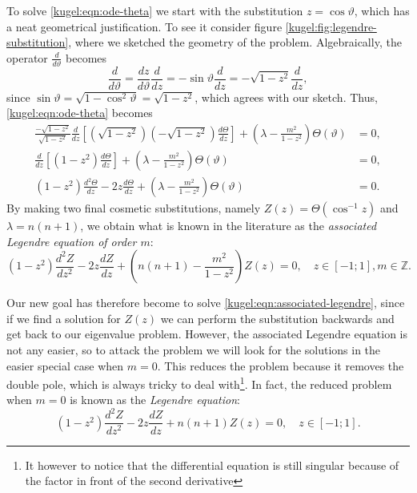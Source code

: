 To solve \eqref{kugel:eqn:ode-theta} we start with the substitution $z = \cos
\vartheta$, which has a neat geometrical justification. To see it consider
figure \ref{kugel:fig:legendre-substitution}, where we sketched the geometry of
the problem. Algebraically, the operator $\frac{d}{d \vartheta}$ becomes
\begin{equation*}
    \frac{d}{d \vartheta}
    = \frac{dz}{d \vartheta}\frac{d}{dz}
    = -\sin \vartheta \frac{d}{dz}
    = -\sqrt{1-z^2} \frac{d}{dz},
\end{equation*} 
since $\sin \vartheta = \sqrt{1 - \cos^2 \vartheta} = \sqrt{1 - z^2}$, which
agrees with our sketch. Thus, \eqref{kugel:eqn:ode-theta} becomes 
\begin{align*}
  \frac{-\sqrt{1-z^2}}{\sqrt{1-z^2}} \frac{d}{dz} \left[
    \left(\sqrt{1-z^2}\right) \left(-\sqrt{1-z^2}\right) \frac{d \Theta}{dz}
  \right]
  + \left( \lambda - \frac{m^2}{1 - z^2} \right)\Theta(\vartheta) &= 0,
  \\
  \frac{d}{dz} \left[ (1-z^2) \frac{d \Theta}{dz} \right]
  + \left( \lambda - \frac{m^2}{1 - z^2} \right)\Theta(\vartheta) &= 0,
  \\
  (1-z^2)\frac{d^2 \Theta}{dz} - 2z\frac{d \Theta}{dz}
  + \left( \lambda - \frac{m^2}{1 - z^2} \right)\Theta(\vartheta) &= 0.
\end{align*}
By making two final cosmetic substitutions, namely $Z(z) = \Theta(\cos^{-1}z)$
and $\lambda = n(n+1)$, we obtain what is known in the literature as the
\emph{associated Legendre equation of order $m$}:
\nocite{olver_introduction_2013}
\begin{equation} \label{kugel:eqn:associated-legendre}
  (1 - z^2)\frac{d^2 Z}{dz^2}
  - 2z\frac{d Z}{dz}
  + \left( n(n + 1) - \frac{m^2}{1 - z^2} \right) Z(z) = 0,
  \quad
  z \in [-1; 1], m \in \mathbb{Z}.
\end{equation}

Our new goal has therefore become to solve
\eqref{kugel:eqn:associated-legendre}, since if we find a solution for $Z(z)$ we
can perform the substitution backwards and get back to our eigenvalue problem.
However, the associated Legendre equation is not any easier, so to attack the
problem we will look for the solutions in the easier special case when $m = 0$.
This reduces the problem because it removes the double pole, which is always
tricky to deal with\footnote{It however to notice that the differential equation
is still singular because of the factor in front of the second derivative}. In
fact, the reduced problem when $m = 0$ is known as the \emph{Legendre equation}:
\begin{equation} \label{kugel:eqn:legendre}
  (1 - z^2)\frac{d^2 Z}{dz^2}
  - 2z\frac{d Z}{dz}
  + n(n + 1) Z(z) = 0,
  \quad
  z \in [-1; 1].
\end{equation}

